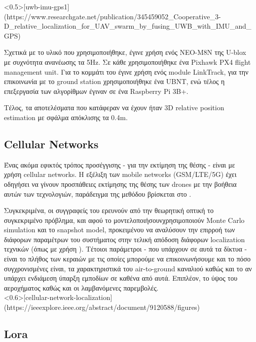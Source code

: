<0.5>[uwb-imu-gps1](https://www.researchgate.net/publication/345459052_Cooperative_3-D_relative_localization_for_UAV_swarm_by_fusing_UWB_with_IMU_and_GPS)

Σχετικά με το υλικό που χρησιμοποιήθηκε, έγινε χρήση ενός NEO-M8N  της U-blox με συχνότητα ανανέωσης τα 5Hz.  
Σε κάθε  χρησιμοποιήθηκε ένα Pixhawk PX4 flight management unit. Για το κομμάτι του  έγινε χρήση
ενός module LinkTrack, για την επικοινωνία με το ground station χρησιμοποιήθηκε ένα UBNT, ενώ τέλος η επεξεργασία των 
αλγορίθμων έγιναν σε ένα Raspberry Pi 3B+. 

Τέλος, τα αποτελέσματα που κατάφεραν να έχουν ήταν 3D relative position estimation με σφάλμα απόκλισης τα 0.4m. 

\subsection{Cellular Networks}
Ένας ακόμα εφικτός τρόπος προσέγγισης - για την εκτίμηση της θέσης - είναι με χρήση
cellular networks. Η εξέλιξη των mobile networks (GSM/LTE/5G) έχει οδηγήσει να γίνουν προσπάθειες εκτίμησης
της θέσης των drones με την βοήθεια αυτών των τεχνολογιών, παράδειγμα της μεθόδου βρίσκεται στο . 

Συγκεκριμένα, οι συγγραφείς του \cite{cellular-network-localization} ερευνούν από την θεωρητική οπτική το συ\-γκε\-κρι\-μένο πρόβλημα, 
και αφού το μοντελοποιήσουν\udot χρησιμοποιούν Monte Carlo simulation και το snapshot model, προκειμένου να αναλύσουν την επιρροή 
των διάφορων παραμέτρων του συστήματος στην τελική απόδοση διάφορων localization τεχνικών (όπως με χρήση ). Τέτοιοι 
παράμετροι - που υπάρχουν σε αυτά τα δίκτυα - είναι το πλήθος των κεραιών με τις οποίες μπορούμε να επικοινωνήσουμε και το πόσο συγχρονισμένες 
είναι, τα χαρακτηριστικά του air-to-ground καναλιού καθώς και το αν υπάρχει ενδιάμεση ύπαρξη εμποδίων σε καθένα από αυτά. Επιπλέον, το 
ύψος του αεροχήματος καθώς και οι λαμβανόμενες παρεμβολές.
\\[0.3cm]

<0.6>[cellular-network-localization](https://ieeexplore.ieee.org/abstract/document/9120588/figures)

\subsection{Lora}
\cite{lora-localization}

